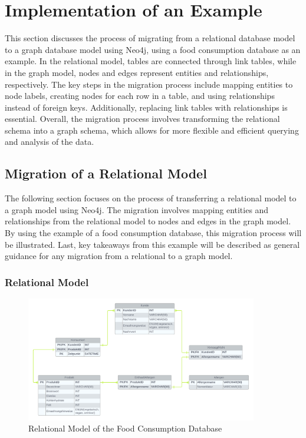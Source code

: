 \section{Implementation of an Example}\label{sec:implementationExampleNeo4j}

This section discusses the process of migrating from a relational database model to a graph database model using Neo4j, using a food consumption database as an example. In the relational model, tables are connected through link tables, while in the graph model, nodes and edges represent entities and relationships, respectively. The key steps in the migration process include mapping entities to node labels, creating nodes for each row in a table, and using relationships instead of foreign keys. Additionally, replacing link tables with relationships is essential. Overall, the migration process involves transforming the relational schema into a graph schema, which allows for more flexible and efficient querying and analysis of the data.

\subsection{Migration of a Relational Model}\label{subsec:migrationRelationModelNeo4j}

The following section focuses on the process of transferring a relational model to a graph model using Neo4j. The migration involves mapping entities and relationships from the relational model to nodes and edges in the graph model. By using the example of a food consumption database, this migration process will be illustrated. Last, key takeaways from this example will be described as general guidance for any migration from a relational to a graph model.

\subsubsection*{Relational Model}

\begin{figure}[H]
    \centering
    \caption{Relational Model of the Food Consumption Database}\label{fig:relationalModelNeo4j}
    \includegraphics[width=0.9\textwidth]{images/neo4j_example_relational_model.png}
\end{figure}

